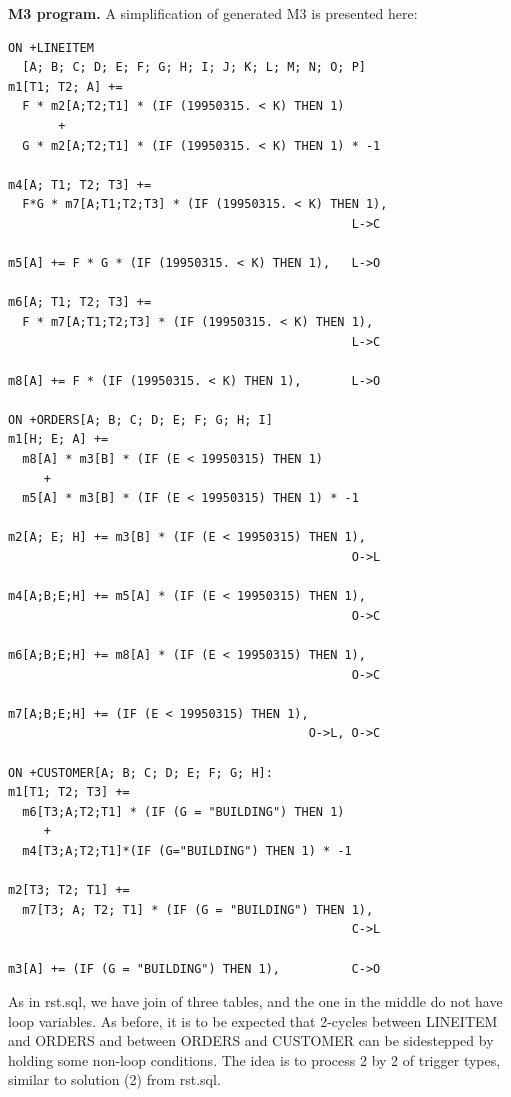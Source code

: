 \documentclass{sig-semester}
\begin{document}
\newpage
\textbf{M3 program.} A simplification of generated M3 is presented here:
\begin{verbatim}
ON +LINEITEM
  [A; B; C; D; E; F; G; H; I; J; K; L; M; N; O; P] 
m1[T1; T2; A] +=
  F * m2[A;T2;T1] * (IF (19950315. < K) THEN 1)
       + 
  G * m2[A;T2;T1] * (IF (19950315. < K) THEN 1) * -1

m4[A; T1; T2; T3] +=
  F*G * m7[A;T1;T2;T3] * (IF (19950315. < K) THEN 1),
                                                L->C
     
m5[A] += F * G * (IF (19950315. < K) THEN 1),   L->O
 
m6[A; T1; T2; T3] +=
  F * m7[A;T1;T2;T3] * (IF (19950315. < K) THEN 1),    
                                                L->C

m8[A] += F * (IF (19950315. < K) THEN 1),       L->O    

ON +ORDERS[A; B; C; D; E; F; G; H; I]
m1[H; E; A] +=
  m8[A] * m3[B] * (IF (E < 19950315) THEN 1)
     + 
  m5[A] * m3[B] * (IF (E < 19950315) THEN 1) * -1
   
m2[A; E; H] += m3[B] * (IF (E < 19950315) THEN 1),    
                                                O->L
 
m4[A;B;E;H] += m5[A] * (IF (E < 19950315) THEN 1),
                                                O->C
 
m6[A;B;E;H] += m8[A] * (IF (E < 19950315) THEN 1),
                                                O->C
 
m7[A;B;E;H] += (IF (E < 19950315) THEN 1),      
                                          O->L, O->C

ON +CUSTOMER[A; B; C; D; E; F; G; H]: 
m1[T1; T2; T3] +=
  m6[T3;A;T2;T1] * (IF (G = "BUILDING") THEN 1)
     + 
  m4[T3;A;T2;T1]*(IF (G="BUILDING") THEN 1) * -1
 
m2[T3; T2; T1] +=
  m7[T3; A; T2; T1] * (IF (G = "BUILDING") THEN 1),  
                                                C->L
 
m3[A] += (IF (G = "BUILDING") THEN 1),          C->O  
\end{verbatim}

As in rst.sql, we have join of three tables, and the one in the middle do not have loop variables. As before, it is to be expected that 2-cycles between LINEITEM and ORDERS and between ORDERS and CUSTOMER can be sidestepped by holding some non-loop conditions. The idea is to process 2 by 2 of trigger types, similar to solution (2) from rst.sql. 
\end{document}
